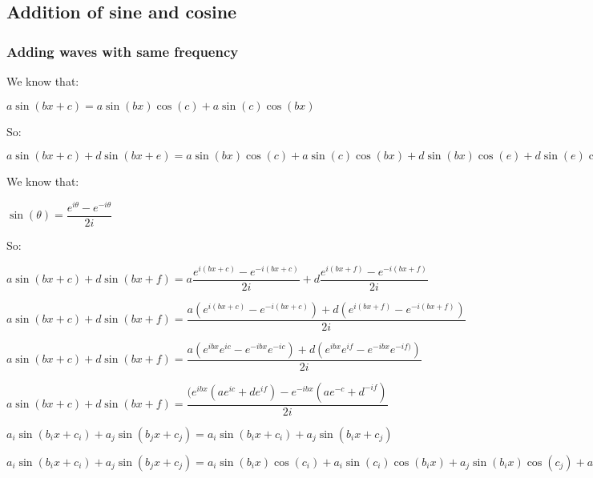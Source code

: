 
\subsection{Addition of sine and cosine}

\subsubsection{Adding waves with same frequency}

We know that:

\(a\sin(bx+c)=a\sin(bx)\cos(c)+a\sin(c)\cos(bx)\)

So:

\(a\sin(bx+c)+d\sin(bx+e)=a\sin(bx)\cos(c)+a\sin(c)\cos(bx)+ d\sin(bx)\cos(e)+d\sin(e)\cos(bx)\)

We know that:

\(\sin(\theta )=\dfrac{e^{i\theta }-e^{-i\theta }}{2i}\)

So:

\(a\sin(bx+c)+d\sin(bx+f)=a\dfrac{e^{i(bx+c)}-e^{-i(bx+c)}}{2i}+d\dfrac{e^{i(bx+f)}-e^{-i(bx+f)}}{2i}\)

\(a\sin(bx+c)+d\sin(bx+f)=\dfrac{a(e^{i(bx+c)}-e^{-i(bx+c)})+d(e^{i(bx+f)}-e^{-i(bx+f)})}{2i}\)

\(a\sin(bx+c)+d\sin(bx+f)=\dfrac{a(e^{ibx}e^{ic}-e^{-ibx}e^{-ic})+d(e^{ibx}e^{if}-e^{-ibx}e^{-if)})}{2i}\)

\(a\sin(bx+c)+d\sin(bx+f)=\dfrac{(e^{ibx}(ae^{ic}+de^{if})-e^{-ibx}(ae^{-c}+d^{-if})}{2i}\)

\(a_i\sin(b_ix+c_i)+a_j\sin(b_jx+c_j)=a_i\sin(b_ix+c_i)+a_j\sin(b_ix+c_j)\)

\(a_i\sin(b_ix+c_i)+a_j\sin(b_jx+c_j)=a_i\sin(b_ix)\cos(c_i)+a_i\sin(c_i)\cos(b_ix)+a_j\sin(b_ix)\cos(c_j)+a_j\sin(c_j)\cos(b_ix)\)

